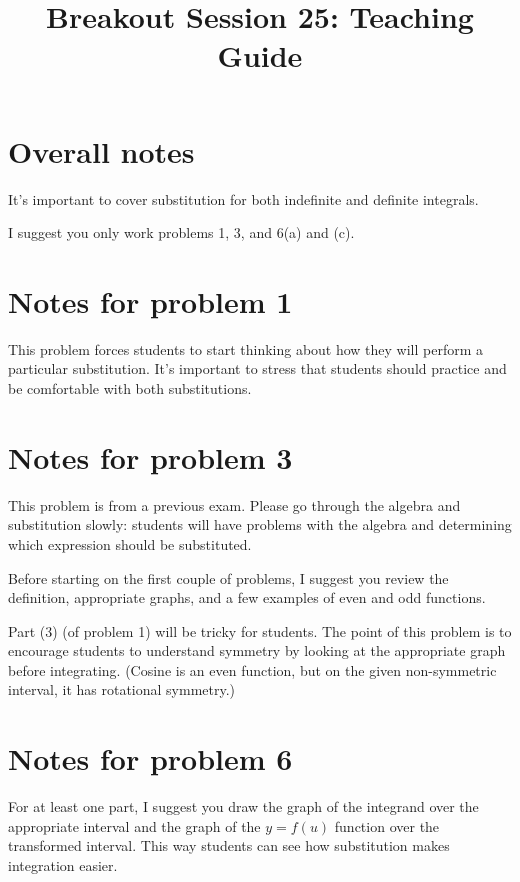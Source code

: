 \documentclass[handout, nooutcomes]{ximera}
\title{Breakout Session 25: Teaching Guide}
\begin{document}
\begin{abstract}

\end{abstract}
\maketitle

\section{Overall notes}
It's important to cover substitution for both indefinite and definite integrals.

I suggest you only work problems 1, 3, and 6(a) and (c). 

\section{Notes for problem 1}
This problem forces students to start thinking about how they will perform a particular substitution.
It’s important to stress that students should practice and be comfortable with both substitutions.

\section{Notes for problem 3}
This problem is from a previous exam.
Please go through the algebra and substitution slowly: students will have problems with the algebra and determining which expression should be substituted.


Before starting on the first couple of problems, I suggest you review the definition, appropriate graphs, and a few examples of even and odd functions.

Part (3) (of problem 1) will be tricky for students.
The point of this problem is to encourage students to understand symmetry by looking at the appropriate graph before integrating.
(Cosine is an even function, but on the given non-symmetric interval, it has rotational symmetry.)

\section{Notes for problem 6}
For at least one part, I suggest you draw the graph of the integrand over the appropriate interval and the graph of the $y = f(u)$ function over the transformed interval.
This way students can see how substitution makes integration easier.
\end{document}
